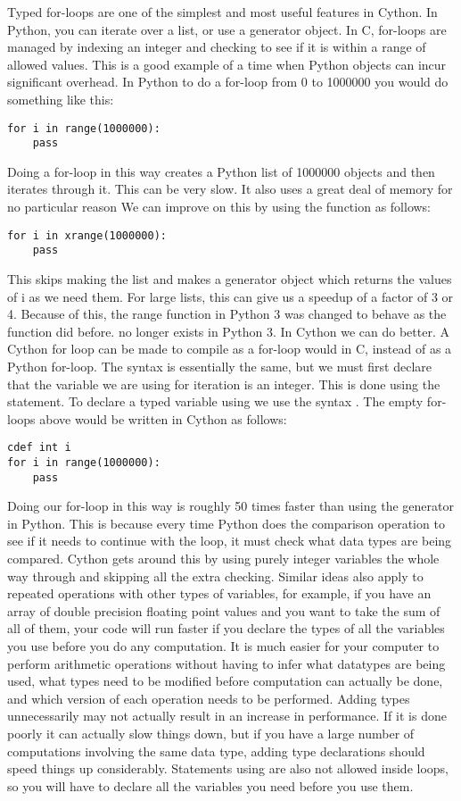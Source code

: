 Typed for-loops are one of the simplest and most useful features in Cython.
In Python, you can iterate over a list, or use a generator object.
In C, for-loops are managed by indexing an integer and checking to see if it is within a range of allowed values.
This is a good example of a time when Python objects can incur significant overhead.
In Python to do a for-loop from 0 to 1000000 you would do something like this:
\begin{lstlisting}
for i in range(1000000):
    pass
\end{lstlisting}
Doing a for-loop in this way creates a Python list of 1000000 objects and then iterates through it.
This can  be very slow.
It also uses a great deal of memory for no particular reason
We can improve on this by using the  function as follows:
\begin{lstlisting}
for i in xrange(1000000):
	pass
\end{lstlisting}
This skips making the list and makes a generator object which returns the values of i as we need them.
For large lists, this can give us a speedup of a factor of 3 or 4.
Because of this, the range function in Python 3 was changed to behave as the  function did before.
 no longer exists in Python 3.
In Cython we can do better.
A Cython for loop can be made to compile as a for-loop would in C, instead of as a Python for-loop.
The syntax is essentially the same, but we must first declare that the variable we are using for iteration is an integer.
This is done using the  statement.
To declare a typed variable using  we use the syntax .
The empty for-loops above would be written in Cython as follows:
\begin{lstlisting}
cdef int i
for i in range(1000000):
	pass
\end{lstlisting}
Doing our for-loop in this way is roughly 50 times faster than using the generator in Python.
This is because every time Python does the comparison operation to see if it needs to continue with the loop, it must check what data types are being compared.
Cython gets around this by using purely integer variables the whole way through and skipping all the extra checking.
Similar ideas also apply to repeated operations with other types of variables, for example, if you have an array of double precision floating point values and you want to take the sum of all of them, your code will run faster if you declare the types of all the variables you use before you do any computation.
It is much easier for your computer to perform arithmetic operations without having to infer what datatypes are being used, what types need to be modified before computation can actually be done, and which version of each operation needs to be performed.
Adding types unnecessarily may not actually result in an increase in performance. If it is done poorly it can actually slow things down, but if you have a large number of computations involving the same data type, adding type declarations should speed things up considerably.
Statements using  are also not allowed inside loops, so you will have to declare all the variables you need before you use them.

